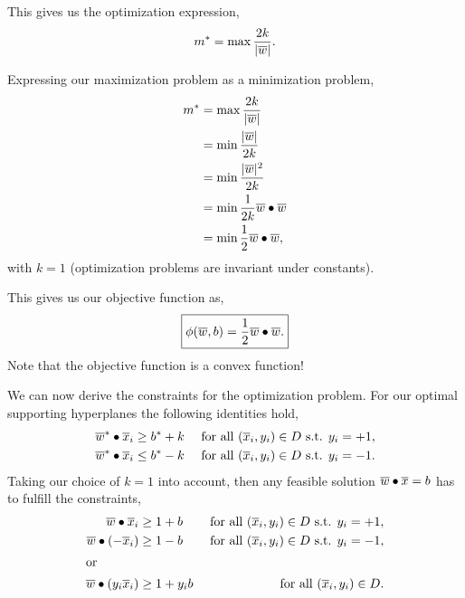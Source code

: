 \documentclass[a4paper,blends,pdf,colorBG,slideColor]{prosper}
\begin{document}
\vspace{.2in}
This gives us the optimization expression, 
\begin{equation*}
\label{eq:margin-maximization1}
m^* = \max \frac{2 k}{|{\overline{w}}|}.
\end{equation*}
\es

Expressing our maximization problem as a minimization problem,
\begin{equation*}
\begin{split}
m^* &= \max \frac{2 k}{|{\overline{w}}|} \\
	&= \min \frac{|{\overline{w}}|}{2 k}\\
	&= \min\frac{|{\overline{w}}|^2}{2 k}\\
	&= \min\frac{1}{2k}\overline{w}\bullet\overline{w}\\
	&= \min\frac{1}{2}\overline{w}\bullet\overline{w},
\end{split}
\end{equation*}
with $k=1$ (optimization problems are invariant under constants).

This gives us our objective function as,
\begin{equation*}
\boxed{\phi(\overline{w},b) = \frac{1}{2}\overline{w}\bullet\overline{w}.}
\end{equation*}
Note that the objective function is a convex function!
\es

We can now derive the constraints for the optimization problem.  For our
optimal supporting hyperplanes the following identities hold,
\begin{align*}
\overline{w}^*\bullet\overline{x}_i&\ge b^*+k & \mbox{ for all } (\overline{x}_i,y_i)\in D\mbox{ s.t. } y_i = +1, \\
\overline{w}^*\bullet\overline{x}_i &\le b^* - k & \mbox{ for all } (\overline{x}_i,y_i)\in D\mbox{ s.t. } y_i = -1.
\end{align*}
Taking our choice of $k=1$ into account, then any feasible solution $\overline{w}\bullet\overline{x}=b$
has to fulfill the constraints,
\begin{align*}
\overline{w}\bullet\overline{x}_i&\ge 1+b & \mbox{ for all } (\overline{x}_i,y_i)\in D\mbox{ s.t. } y_i = +1, \\
\overline{w}\bullet(-\overline{x}_i) &\ge 1-b & \mbox{ for all } (\overline{x}_i,y_i)\in D\mbox{ s.t. } y_i = -1,\\
\intertext{or}
\overline{w}\bullet(y_i \overline{x}_i)&\ge 1+ y_i b & \mbox{ for all } (\overline{x}_i,y_i)\in D. 
\end{align*}
\es

\end{document}
